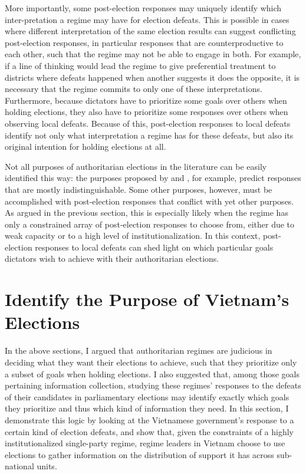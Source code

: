 \documentclass[12pt]{article}
\newcommand{\1}{\mathbbm{1}}
\begin{document}
More importantly, some post-election responses may uniquely identify which inter-pretation a regime may have for election defeats. This is possible in cases where different interpretation of the same election results can suggest conflicting post-election responses, in particular responses that are counterproductive to each other, such that the regime may not be able to engage in both. For example, if a line of thinking would lead the regime to give preferential treatment to districts where defeats happened when another suggests it does the opposite, it is necessary that the regime commits to only one of these interpretations. Furthermore, because dictators have to prioritize some goals over others when holding elections, they also have to prioritize some responses over others when observing local defeats. Because of this, post-election responses to local defeats identify not only what interpretation a regime has for these defeats, but also its original intention for holding elections at all. 

Not all purposes of authoritarian elections in the literature can be easily identified this way: the purposes proposed by \cite{Miller2015} and \cite{Geddes2005}, for example, predict responses that are mostly indistinguishable. Some other purposes, however, must be accomplished with post-election responses that conflict with yet other purposes. As argued in the previous section, this is especially likely when the regime has only a constrained array of post-election responses to choose from, either due to weak capacity or to a high level of institutionalization. In this context, post-election responses to local defeats can shed light on which particular goals dictators wish to achieve with their authoritarian elections.

\section{Identify the Purpose of Vietnam's Elections}
\label{sec:vietnam}

In the above sections, I argued that authoritarian regimes are judicious in deciding what they want their elections to achieve, such that they prioritize only a subset of goals when holding elections. I also suggested that, among those goals pertaining information collection, studying these regimes' responses to the defeats of their candidates in parliamentary elections may identify exactly which goals they prioritize and thus which kind of information they need. In this section, I demonstrate this logic by looking at the Vietnamese government's response to a certain kind of election defeats, and show that, given the constraints of a highly institutionalized single-party regime, regime leaders in Vietnam choose to use elections to gather information on the distribution of support it has across sub-national units.
\end{document}

